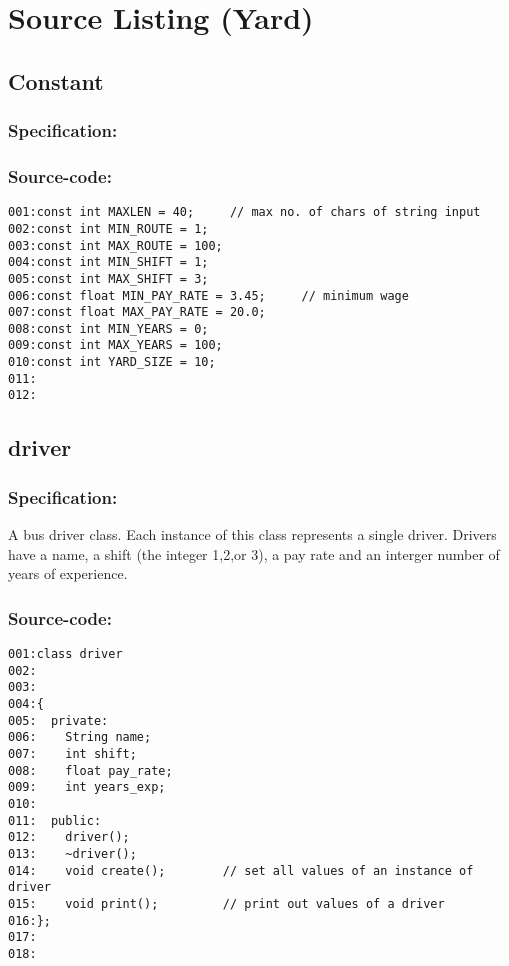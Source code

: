 \chapter{Source Listing (Yard)}
\small

\section{Constant}
\subsection*{Specification:}

\subsection*{Source-code:}
\begin{verbatim}
001:const int MAXLEN = 40;     // max no. of chars of string input
002:const int MIN_ROUTE = 1;
003:const int MAX_ROUTE = 100;
004:const int MIN_SHIFT = 1;         
005:const int MAX_SHIFT = 3;
006:const float MIN_PAY_RATE = 3.45;     // minimum wage
007:const float MAX_PAY_RATE = 20.0;
008:const int MIN_YEARS = 0;
009:const int MAX_YEARS = 100;
010:const int YARD_SIZE = 10;
011:
012:
\end{verbatim}
\section{driver}
\subsection*{Specification:}
A bus driver class. Each instance of this class represents a
  single driver. Drivers have a name, a shift (the integer
  1,2,or 3), a pay rate and an interger number of years of
  experience.
\subsection*{Source-code:}
\begin{verbatim}
001:class driver
002:
003:
004:{
005:  private:
006:    String name;
007:    int shift;
008:    float pay_rate;
009:    int years_exp;
010:
011:  public:
012:    driver();
013:    ~driver();
014:    void create();        // set all values of an instance of driver
015:    void print();         // print out values of a driver
016:};
017:
018:
\end{verbatim}
